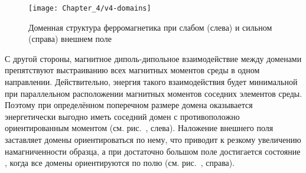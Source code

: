 %

\begin{wrapfigure}[]{r}{0.4\textwidth}
    \centering\texttt{[image: Chapter\_4/v4-domains]}
    \caption{Доменная структура ферромагнетика при слабом (слева)
    и сильном (справа) внешнем поле}
\end{wrapfigure}

С другой стороны, магнитное диполь-дипольное взаимодействие между доменами препятствуют
выстраиванию всех магнитных моментов среды в одном направлении.
Действительно, энергия такого взаимодействия будет минимальной
при параллельном расположении магнитных моментов соседних элементов среды.
Поэтому при определённом поперечном размере домена оказывается
энергетически выгодно иметь соседний домен с противоположно ориентированным моментом
(см. рис.~, слева).
Наложение внешнего поля заставляет домены ориентироваться
по нему, что приводит к резкому увеличению намагниченности образца, а при
достаточно большом поле достигается состояние ,
когда все домены ориентируются по полю (см. рис.~, справа).


